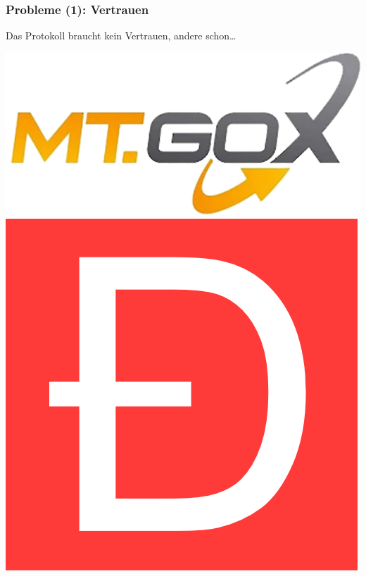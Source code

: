 \documentclass[aspectratio=169,x11names]{beamer}
\begin{document}

\begin{frame}
\frametitle{Probleme (1): Vertrauen}
Das Protokoll braucht kein Vertrauen, andere schon\dots\pause 
\bigskip\bigskip

\begin{center}
\includegraphics[scale=1]{images/mtgox.png} \qquad\qquad
\includegraphics[scale=0.15]{images/DAO-logo.png} 
\end{center}
\end{frame}

\end{document}
